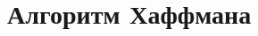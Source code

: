\documentclass[a4paper, 12pt]{extarticle}
\begin{document}
	\section{Алгоритм Хаффмана}
	
\end{document}

